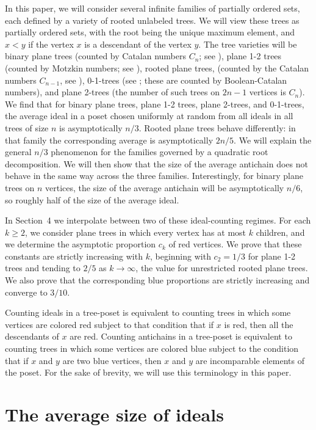 \documentclass[11pt, onesided]{amsart}
\theoremstyle{remark}
\begin{document}
In this paper, we will consider several infinite families of partially ordered sets, each defined by a variety of rooted unlabeled trees. 
We will view these trees as partially ordered sets, with the root being the unique maximum element, and $x<y$ if the vertex $x$ is a descendant of the 
vertex $y$. The  tree varieties will
be binary plane trees (counted by Catalan numbers $C_n$; see \cite{StanleyCatalan}), plane 1-2 trees (counted by Motzkin numbers; see \cite{DonagheyShapiro}), rooted plane trees, (counted by the Catalan numbers $C_{n-1}$, see \cite{StanleyCatalan}), 0-1-trees (see \cite{Bona01Trees}; these are counted by Boolean-Catalan numbers), and plane 2-trees (the number of such trees on $2n-1$ vertices is $C_n$). 
We find that for binary plane trees, plane 1-2 trees, plane 2-trees, and 0-1-trees, the average ideal in a poset chosen uniformly at random from all ideals in all trees of size $n$ is asymptotically $n/3$. Rooted plane trees behave differently: in that family the corresponding average is asymptotically $2n/5$. We will explain the general $n/3$ phenomenon for the families governed by a quadratic root decomposition. We will then show that the size of the average antichain does not behave in the same
way across the three families. Interestingly, for binary plane trees on $n$ vertices, the size of the average antichain will be asymptotically $n/6$, so roughly half of the size of the average ideal. 

In Section~4 we interpolate between two of these ideal-counting regimes.  For each $k\geq 2$, we consider plane trees in which every vertex has at most $k$ children, and we determine the asymptotic proportion $c_k$ of red vertices.  We prove that these constants are strictly increasing with $k$, beginning with $c_2=1/3$ for plane 1-2 trees and tending to $2/5$ as $k\to\infty$, the value for unrestricted rooted plane trees. We also prove that the corresponding blue proportions are strictly increasing and converge to $3/10$.

Counting ideals in a tree-poset is equivalent to counting trees in which some vertices are colored red subject to that condition that if $x$ is red, then all the descendants of $x$ are red. Counting antichains in a tree-poset is equivalent to counting trees in which some vertices are colored blue subject to the condition that if $x$ and $y$ are two blue vertices, then $x$ and $y$ are incomparable elements of the poset.  For the sake of brevity, we will use this terminology in this paper. 

\section{The average size of ideals}
\label{sec:ideals}
\end{document}
